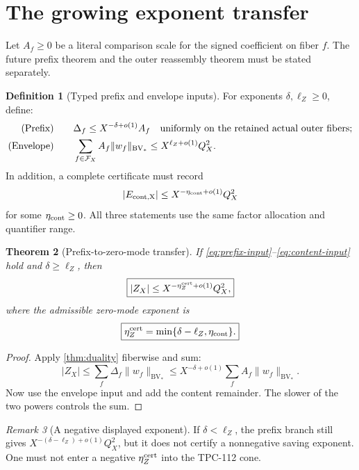 \documentclass[11pt]{article}
\newtheorem{theorem}{Theorem}[section]
\theoremstyle{definition}
\newtheorem{definition}[theorem]{Definition}
\theoremstyle{remark}
\newtheorem{remark}[theorem]{Remark}
\newcommand{\cF}{\mathcal F}
\begin{document}
\section{The growing exponent transfer}

Let \(A_f\ge0\) be a literal comparison scale for the signed
coefficient on fiber \(f\).  The future prefix theorem and the outer
reassembly theorem must be stated separately.

\begin{definition}[Typed prefix and envelope inputs]
\label{def:inputs}
For exponents \(\delta,\ell_Z\ge0\), define:
\begin{align}
\text{\rm(Prefix)}\qquad
&\Delta_f\le
 X^{-\delta+o(1)}A_f
 \quad\text{uniformly on the retained actual outer fibers};
\label{eq:prefix-input}\\
\text{\rm(Envelope)}\qquad
&\sum_{f\in\cF_X}
 A_f\|w_f\|_{\mathrm{BV}_*}
 \le X^{\ell_Z+o(1)}Q_X^2.
\label{eq:envelope-input}
\end{align}
In addition, a complete certificate must record
\begin{equation}
 |E_{\rm cont,X}|
 \le X^{-\eta_{\rm cont}+o(1)}Q_X^2
\label{eq:content-input}
\end{equation}
for some \(\eta_{\rm cont}\ge0\).  All three statements use the same
factor allocation and quantifier range.
\end{definition}

\begin{theorem}[Prefix-to-zero-mode transfer]
\label{thm:transfer}
If \eqref{eq:prefix-input}--\eqref{eq:content-input} hold and
\(\delta\ge\ell_Z\), then
\[
 \boxed{
 |Z_X|
 \le
 X^{-\eta_Z^{\rm cert}+o(1)}Q_X^2,}
\]
where the admissible zero-mode exponent is
\[
 \boxed{
 \eta_Z^{\rm cert}
 =\min\{\delta-\ell_Z,\eta_{\rm cont}\}.}
\]
\end{theorem}

\begin{proof}
Apply \cref{thm:duality} fiberwise and sum:
\[
 |Z_X|
 \le\sum_f\Delta_f\|w_f\|_{\mathrm{BV}_*}
 \le X^{-\delta+o(1)}
 \sum_fA_f\|w_f\|_{\mathrm{BV}_*}.
\]
Now use the envelope input and add the content remainder.  The slower
of the two powers controls the sum.
\end{proof}

\begin{remark}[A negative displayed exponent]
If \(\delta<\ell_Z\), the prefix branch still gives
\(X^{-(\delta-\ell_Z)+o(1)}Q_X^2\), but it does not certify a
nonnegative saving exponent.  One must not enter a negative
\(\eta_Z^{\rm cert}\) into the TPC-112 cone.
\end{remark}
\end{document}
